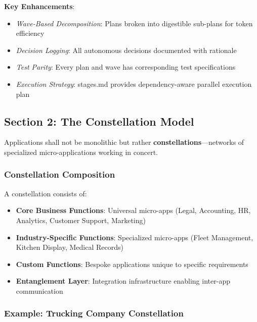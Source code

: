 \documentclass[12pt,letterpaper]{article}
\begin{document}
\textbf{Key Enhancements}:
\begin{itemize}
    \item \textit{Wave-Based Decomposition}: Plans broken into digestible sub-plans for token efficiency
    \item \textit{Decision Logging}: All autonomous decisions documented with rationale
    \item \textit{Test Parity}: Every plan and wave has corresponding test specifications
    \item \textit{Execution Strategy}: stages.md provides dependency-aware parallel execution plan
\end{itemize}

\subsection{Section 2: The Constellation Model}

Applications shall not be monolithic but rather \textbf{constellations}—networks of specialized micro-applications working in concert.

\subsubsection{Constellation Composition}

A constellation consists of:

\begin{itemize}
    \item \textbf{Core Business Functions}: Universal micro-apps (Legal, Accounting, HR, Analytics, Customer Support, Marketing)
    \item \textbf{Industry-Specific Functions}: Specialized micro-apps (Fleet Management, Kitchen Display, Medical Records)
    \item \textbf{Custom Functions}: Bespoke applications unique to specific requirements
    \item \textbf{Entanglement Layer}: Integration infrastructure enabling inter-app communication
\end{itemize}

\subsubsection{Example: Trucking Company Constellation}
\end{document}
